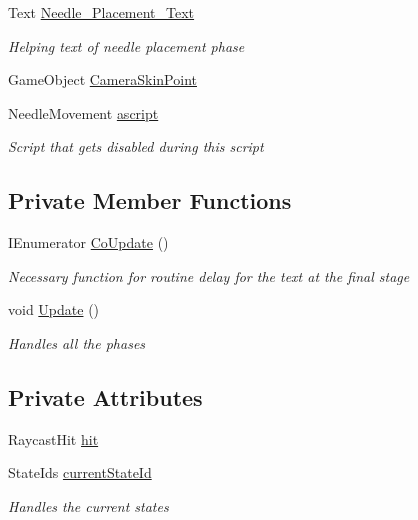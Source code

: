 \begin{DoxyCompactItemize}
Text \mbox{\hyperlink{class_states_by_switch_a36ebc107be9b12cb8a97bf1460423000}{Needle\+\_\+\+Placement\+\_\+\+Text}}
\begin{DoxyCompactList}\small\item\em Helping text of needle placement phase \end{DoxyCompactList}\item 
Game\+Object \mbox{\hyperlink{class_states_by_switch_a2a073b0e193c0609b5c3681434b4f24e}{Camera\+Skin\+Point}}
\item 
Needle\+Movement \mbox{\hyperlink{class_states_by_switch_a6b08cab5dde267f953387e4885318be4}{ascript}}
\begin{DoxyCompactList}\small\item\em Script that gets disabled during this script \end{DoxyCompactList}\end{DoxyCompactItemize}
\subsection*{Private Member Functions}
\begin{DoxyCompactItemize}
\item 
I\+Enumerator \mbox{\hyperlink{class_states_by_switch_abdcace6428d6394da78e41b19483e813}{Co\+Update}} ()
\begin{DoxyCompactList}\small\item\em Necessary function for routine delay for the text at the final stage \end{DoxyCompactList}\item 
void \mbox{\hyperlink{class_states_by_switch_adb2e0b871f32a901e5a9a4554cd3f797}{Update}} ()
\begin{DoxyCompactList}\small\item\em Handles all the phases \end{DoxyCompactList}\end{DoxyCompactItemize}
\subsection*{Private Attributes}
\begin{DoxyCompactItemize}
\item 
Raycast\+Hit \mbox{\hyperlink{class_states_by_switch_a541dfd2e3ba0cdfa1a33656455a2086f}{hit}}
\item 
State\+Ids \mbox{\hyperlink{class_states_by_switch_a6c039db026faf623438de4774163cf64}{current\+State\+Id}}
\begin{DoxyCompactList}\small\item\em Handles the current states \end{DoxyCompactList}\end{DoxyCompactItemize}


